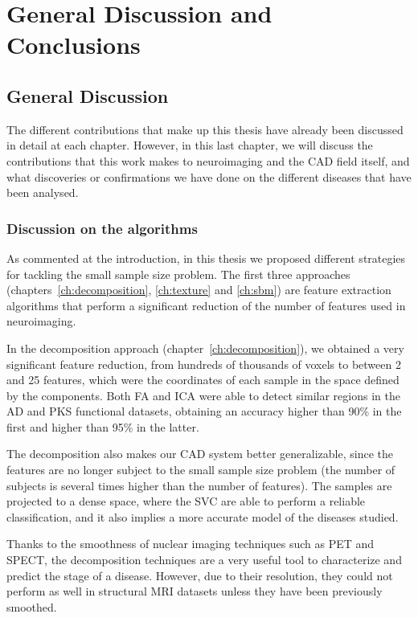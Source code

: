 \chapter{General Discussion and Conclusions}\label{ch:discusion}
\section{General Discussion}
The different contributions that make up this thesis have already been discussed in detail at each chapter. However, in this last chapter, we will discuss the contributions that this work makes to neuroimaging and the \ac{CAD} field itself, and what discoveries or confirmations we have done on the different diseases that have been analysed. 

\subsection{Discussion on the algorithms}
As commented at the introduction, in this thesis we proposed different strategies for tackling the small sample size problem. The first three approaches (chapters~\ref{ch:decomposition}, \ref{ch:texture} and \ref{ch:sbm}) are feature extraction algorithms that perform a significant reduction of the number of features used in neuroimaging. 

In the decomposition approach (chapter~\ref{ch:decomposition}), we obtained a very significant feature reduction, from hundreds of thousands of voxels to between 2 and 25 features, which were the coordinates of each sample in the space defined by the components. Both \ac{FA} and \ac{ICA} were able to detect similar regions in the \ac{AD} and \ac{PKS} functional datasets, obtaining an accuracy higher than 90\% in the first and higher than 95\% in the latter. 

The decomposition also makes our \ac{CAD} system better generalizable, since the features are no longer subject to the small sample size problem (the number of subjects is several times higher than the number of features). The samples are projected to a dense space, where the \ac{SVC} are able to perform a reliable classification, and it also implies a more accurate model of the diseases studied. 

Thanks to the smoothness of nuclear imaging techniques such as \ac{PET} and \ac{SPECT}, the decomposition techniques are a very useful tool to characterize and predict the stage of a disease. However, due to their resolution, they could not perform as well in structural \ac{MRI} datasets unless they have been previously smoothed. 

